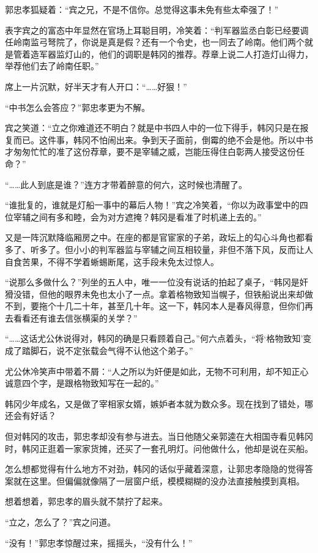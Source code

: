 郭忠孝狐疑着：“宾之兄，不是不信你。总觉得这事未免有些太牵强了！”

表字宾之的富态中年显然在官场上耳聪目明，冷笑着：“判军器监丞白彰已经要调任岭南监弓弩院了，你说是真是假？还有一个令史，也一同去了岭南。他们两个就是管着造军器监灯山的，他们的调职是韩冈的推荐。荐章上说二人打造灯山得力，举荐他们去了岭南任职。”

席上一片沉默，好半天才有人开口：“……好狠！”

“中书怎么会答应？”郭忠孝更为不解。

宾之笑道：“立之你难道还不明白？就是中书四人中的一位下得手，韩冈只是在报复而已。这件事，韩冈不怕闹出来。争到天子面前，倒霉的绝不会是他。所以中书才匆匆忙忙的准了这份荐章，要不是宰辅之威，岂能压得住白彰两人接受这份任命？”

“……此人到底是谁？”连方才带着醉意的何六，这时候也清醒了。

“谁批复的，谁就是灯船一事中的幕后人物！”宾之冷笑着，“你以为政事堂中的四位宰辅之间有多和睦，会为对方遮掩？韩冈是看准了时机递上去的。”

又是一阵沉默降临厢房之中。在座的都是官宦家的子弟，政坛上的勾心斗角也都看多了、听多了。但小小的判军器监与宰辅之间互相较量，非但不落下风，反而让人自食苦果，不得不学着蜥蜴断尾，这手段未免太过惊人。

“说那么多做什么？”列坐的五人中，唯一一位没有说话的拍起了桌子，“韩冈是奸猾没错，但他的眼界未免也太小了一点。拿着格物致知当幌子，但铁船说出来却做不到，要拖个十几二十年，甚至几十年。这一下，韩冈本人是春风得意，但你们再去看看还有谁去信张横渠的关学？”

“……这话尤公休说得对，韩冈的确是只看顾着自己。”何六点着头，“将‘格物致知’变成了踏脚石，说不定张载会气得不认他这个弟子。”

尤公休冷笑声中带着不屑：“人之所以为奸便是如此，无物不可利用，却不知正心诚意四个字，是跟格物致知写在一起的。”

韩冈少年成名，又是做了宰相家女婿，嫉妒者本就为数众多。现在找到了错处，哪还会有好话？

但对韩冈的攻击，郭忠孝却没有参与进去。当日他随父亲郭逵在大相国寺看见韩冈时，韩冈正逛着一家家货摊，还买了一套孔明灯。问他做什么，他却是说在买船。

怎么想都觉得有什么地方不对劲，韩冈的话似乎藏着深意，让郭忠孝隐隐的觉得答案就在这里。但偏偏就像隔了一层窗户纸，模模糊糊的没办法直接触摸到真相。

想着想着，郭忠孝的眉头就不禁拧了起来。

“立之，怎么了？”宾之问道。

“没有！”郭忠孝惊醒过来，摇摇头，“没有什么！”

